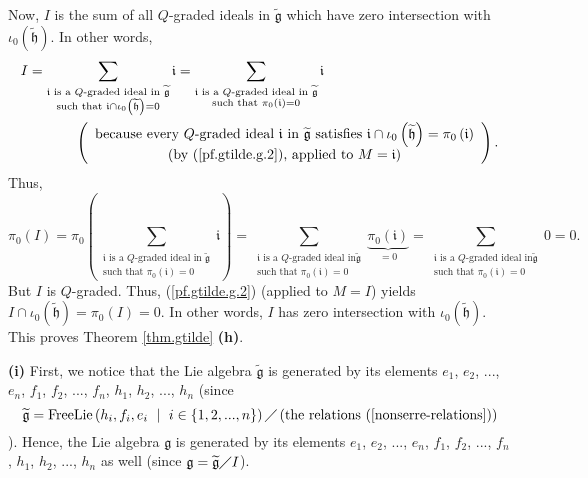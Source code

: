 \documentclass[etingof-lie.tex]{subfiles}
\begin{document}
\begin{verlong}
Now, $I$ is the sum of all $Q$-graded ideals in $\widetilde{\mathfrak{g}}$
which have zero intersection with $\iota_{0}\left(  \widetilde{\mathfrak{h}%
}\right)  $. In other words,%
\begin{align*}
I  &  =\sum\limits_{\substack{\mathfrak{i}\text{ is a }Q\text{-graded ideal in
}\widetilde{\mathfrak{g}}\\\text{such that }\mathfrak{i}\cap\iota_{0}\left(
\widetilde{\mathfrak{h}}\right)  =0}}\mathfrak{i}=\sum
\limits_{\substack{\mathfrak{i}\text{ is a }Q\text{-graded ideal in
}\widetilde{\mathfrak{g}}\\\text{such that }\pi_{0}\left(  \mathfrak{i}%
\right)  =0}}\mathfrak{i}\\
&  \ \ \ \ \ \ \ \ \ \ \left(
\begin{array}
[c]{c}%
\text{because every }Q\text{-graded ideal }\mathfrak{i}\text{ in
}\widetilde{\mathfrak{g}}\text{ satisfies }\mathfrak{i}\cap\iota_{0}\left(
\widetilde{\mathfrak{h}}\right)  =\pi_{0}\left(  \mathfrak{i}\right) \\
\text{(by (\ref{pf.gtilde.g.2}), applied to }M=\mathfrak{i}\text{)}%
\end{array}
\right)  .
\end{align*}
Thus,%
\[
\pi_{0}\left(  I\right)  =\pi_{0}\left(  \sum\limits_{\substack{\mathfrak{i}%
\text{ is a }Q\text{-graded ideal in }\widetilde{\mathfrak{g}}\\\text{such
that }\pi_{0}\left(  \mathfrak{i}\right)  =0}}\mathfrak{i}\right)
=\sum\limits_{\substack{\mathfrak{i}\text{ is a }Q\text{-graded ideal in
}\widetilde{\mathfrak{g}}\\\text{such that }\pi_{0}\left(  \mathfrak{i}%
\right)  =0}}\underbrace{\pi_{0}\left(  \mathfrak{i}\right)  }_{=0}%
=\sum\limits_{\substack{\mathfrak{i}\text{ is a }Q\text{-graded ideal in
}\widetilde{\mathfrak{g}}\\\text{such that }\pi_{0}\left(  \mathfrak{i}%
\right)  =0}}0=0.
\]
But $I$ is $Q$-graded. Thus, (\ref{pf.gtilde.g.2}) (applied to $M=I$) yields
$I\cap\iota_{0}\left(  \widetilde{\mathfrak{h}}\right)  =\pi_{0}\left(
I\right)  =0$. In other words, $I$ has zero intersection with $\iota
_{0}\left(  \widetilde{\mathfrak{h}}\right)  $. This proves Theorem
\ref{thm.gtilde} \textbf{(h)}.
\end{verlong}

\bigskip

\textbf{(i)} First, we notice that the Lie algebra $\widetilde{\mathfrak{g}}$
is generated by its elements $e_{1}$, $e_{2}$, $...$, $e_{n}$, $f_{1}$,
$f_{2}$, $...$, $f_{n}$, $h_{1}$, $h_{2}$, $...$, $h_{n}$ (since
\[
\widetilde{\mathfrak{g}}=\operatorname*{FreeLie}\left(  h_{i},f_{i}%
,e_{i}\ \mid\ i\in\left\{  1,2,...,n\right\}  \right)  \diagup\left(
\text{the relations (\ref{nonserre-relations})}\right)
\]
). Hence, the Lie algebra $\mathfrak{g}$ is generated by its elements $e_{1}$,
$e_{2}$, $...$, $e_{n}$, $f_{1}$, $f_{2}$, $...$, $f_{n}$, $h_{1}$, $h_{2}$,
$...$, $h_{n}$ as well (since $\mathfrak{g}=\widetilde{\mathfrak{g}}\diagup I$).
\end{document}
